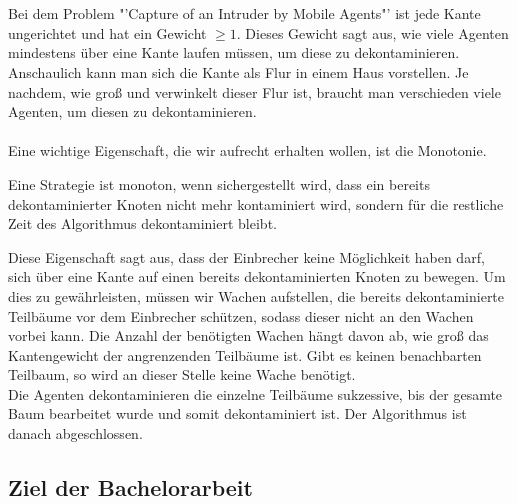 \\
\\
Bei dem Problem "'Capture of an Intruder by Mobile Agents"' ist jede Kante ungerichtet und hat ein Gewicht $\geq 1$. Dieses Gewicht sagt aus, wie viele Agenten mindestens über eine Kante laufen müssen, um diese zu dekontaminieren. Anschaulich kann man sich die Kante als Flur in einem Haus vorstellen. Je nachdem, wie groß und verwinkelt dieser Flur ist, braucht man verschieden viele Agenten, um diesen  zu dekontaminieren.
\\
\\
Eine wichtige Eigenschaft, die wir aufrecht erhalten wollen, ist die Monotonie. 
\begin{mydef}\label{def_monotonie}
	Eine Strategie ist monoton, wenn sichergestellt wird, dass ein bereits dekontaminierter Knoten nicht mehr kontaminiert wird, sondern für die restliche Zeit des Algorithmus dekontaminiert bleibt.
\end{mydef}
Diese Eigenschaft sagt aus, dass der Einbrecher keine Möglichkeit haben darf, sich über eine Kante auf einen bereits dekontaminierten Knoten zu bewegen. Um dies zu gewährleisten, müssen wir Wachen aufstellen, die bereits dekontaminierte Teilbäume vor dem Einbrecher schützen, sodass dieser nicht an den Wachen vorbei kann. Die Anzahl der benötigten Wachen hängt davon ab, wie groß das Kantengewicht der angrenzenden Teilbäume ist. Gibt es keinen benachbarten Teilbaum, so wird an dieser Stelle keine Wache benötigt.\\
Die Agenten dekontaminieren die einzelne Teilbäume sukzessive, bis der gesamte Baum bearbeitet wurde und somit dekontaminiert ist. Der Algorithmus ist danach abgeschlossen.

\subsection{Ziel der Bachelorarbeit}


